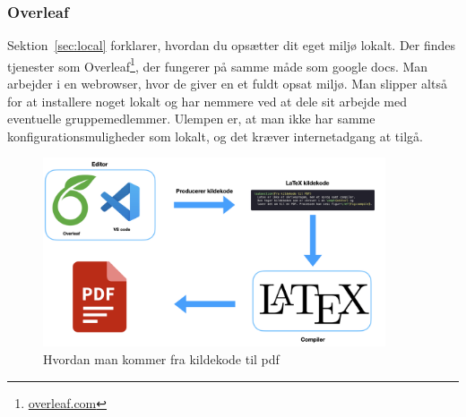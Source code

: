 \documentclass{article}
\begin{document}
   \subsubsection{Overleaf}
     Sektion~\ref{sec:local} forklarer, hvordan du opsætter dit eget miljø lokalt.
     Der findes tjenester som Overleaf\footnote{\url{overleaf.com}}, der fungerer
     på samme måde som google docs. Man arbejder i en webrowser, hvor de giver en et fuldt opsat
     miljø. Man slipper altså for at installere noget lokalt og har nemmere ved
     at dele sit arbejde med eventuelle gruppemedlemmer. Ulempen er, at man ikke
     har samme konfigurationsmuligheder som lokalt, og det kræver internetadgang
     at tilgå.
     \begin{figure}[h]
       \centering\includegraphics[width=0.9\textwidth]{assets/compile.png}
       \caption{Hvordan man kommer fra kildekode til pdf}\label{fig:compile}
     \end{figure}
\end{document}
